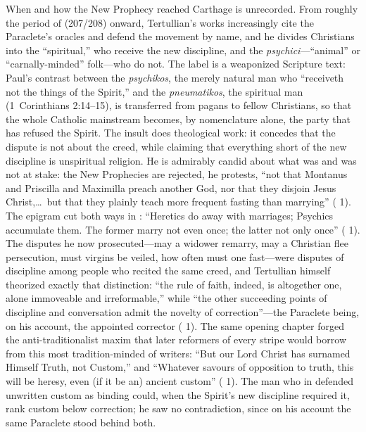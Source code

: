 When and how the New Prophecy reached Carthage is unrecorded. From roughly the
period of  (207/208) onward, Tertullian's works
increasingly cite the Paraclete's oracles and defend the movement by name, and
he divides Christians into the ``spiritual,'' who receive the new discipline,
and the \textit{psychici}---``animal'' or ``carnally-minded'' folk---who do
not. The label is a weaponized Scripture text: Paul's contrast between the
\textit{psychikos}, the merely natural man who ``receiveth not the things of
the Spirit,'' and the \textit{pneumatikos}, the spiritual man (1~Corinthians
2:14--15), is transferred from pagans to fellow Christians, so that the whole
Catholic mainstream becomes, by nomenclature alone, the party that has
refused the Spirit. The insult does theological work: it concedes that the
dispute is not about the creed, while claiming that everything short of the
new discipline is unspiritual religion. He is admirably candid about what was and was not at stake: the New
Prophecies are rejected, he protests, ``not that Montanus and Priscilla and
Maximilla preach another God, nor that they disjoin Jesus Christ,\ldots\ but
that they plainly teach more frequent fasting than marrying'' ( 1). The epigram cut both ways in : ``Heretics do
away with marriages; Psychics accumulate them. The former marry not even once;
the latter not only once'' ( 1). The disputes he now
prosecuted---may a widower remarry, may a Christian flee persecution, must
virgins be veiled, how often must one fast---were disputes of discipline among
people who recited the same creed, and Tertullian himself theorized exactly
that distinction: ``the rule of faith, indeed, is altogether one, alone
immoveable and irreformable,'' while ``the other succeeding points of
discipline and conversation admit the novelty of correction''---the Paraclete
being, on his account, the appointed corrector ( 1). The same opening chapter forged the anti-traditionalist maxim
that later reformers of every stripe would borrow from this most
tradition-minded of writers: ``But our Lord Christ has surnamed Himself
Truth, not Custom,'' and ``Whatever savours of opposition to truth, this will
be heresy, even (if it be an) ancient custom'' ( 1). The man who in  defended unwritten custom as
binding could, when the Spirit's new discipline required it, rank custom
below correction; he saw no contradiction, since on his account the same
Paraclete stood behind both.

